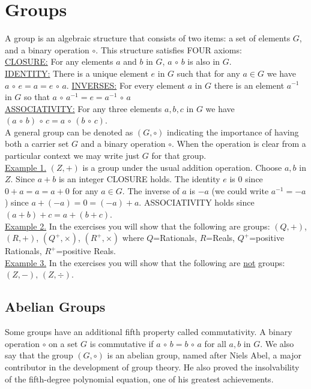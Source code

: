 \documentclass[12pt]{book}
\theoremstyle{definition}
\begin{document}
\section{Groups}
\quad A group is an algebraic structure that consists of two items: a set of elements $G$, and a binary operation $\circ$.  This structure satisfies FOUR axioms:\\
\underline{CLOSURE:} For any elements $a$ and $b$ in $G$, $a\,\circ\,b$ is also in $G$.\\
\underline{IDENTITY:} There is a unique element $e$ in $G$ such that for any $a\in G$ we have $a\,\circ\,e=a=e\,\circ\,a$.
\underline{INVERSES:} For every element $a$ in $G$ there is an element $a^{-1}$ in $G$ so that $a\,\circ\,a^{-1}=e=a^{-1}\,\circ\,a$\\
\underline{ASSOCIATIVITY:} For any three elements $a, b, c$ in $G$ we have $(a\,\circ\,b)\,\circ\,c=a\,\circ\,(b\,\circ\,c).$\\
A general group can be denoted as $(G,\circ)$ indicating the importance of having both a carrier set $G$ and a binary operation $\circ$.  When the operation is clear from a particular context we may write just $G$ for that group.\\[.1in]
\underline{Example 1.} $(Z,+)$ is a group under the usual addition operation.  Choose $a,b$ in $Z$.  Since $a+b$ is an integer CLOSURE holds.  The identity $e$ is 0 since $0+a=a=a+0$ for any $a\in G$.  The inverse of $a$ is $-a$ (we could write $a^{-1}=-a$) since $a+(-a)=0=(-a)+a$.  ASSOCIATIVITY holds since $(a+b)+c = a+(b+c)$.\\[.1in]
\underline{Example 2.}  In the exercises you will show that the following are groups: $(Q,+)$, $(R,+)$, $(Q^+,\times)$, $(R^+,\times)$ where $Q$=Rationals, $R$=Reals, $Q^+$=positive Rationals, $R^+$=positive Reals.\\[.1in]
\underline{Example 3.} In the exercises you will show that the following are \underline{not} groups: $(Z,-),\,(Z,\div)$.\\[.1in]

\subsection{Abelian Groups}
\rule{0in}{.5in}
Some groups have an additional fifth property called commutativity.  A binary operation $\circ$ on a set $G$ is commutative if $a\,\circ\,b = b\,\circ\,a$ for all $a,b$ in $G$.  We also say that the group $(G,\circ)$ is an abelian group, named after Niels Abel, a major contributor in the development of group theory.  He also proved the insolvability of the fifth-degree polynomial equation, one of his greatest achievements.
\end{document}
